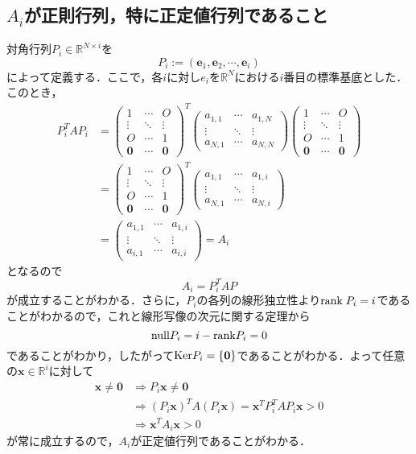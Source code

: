 \documentclass{jsarticle}
\theoremstyle{definition}
\theoremstyle{mystyle} %
\begin{document}
\subsection*{\Large $A_i$が正則行列，特に正定値行列であること}
対角行列$P_i\in \mathbb{R}^{N\times i}$を
$$P_i:=({\bm e_1},{\bm e_2},\cdots ,{\bm e_i})$$
によって定義する．ここで，各$i$に対し$e_i$を$\mathbb{R}^N$における$i$番目の標準基底とした．このとき，
\begin{align*}
P_i^TA P_i&=\left(\begin{array}{ccc}
1 & \cdots & O \\
\vdots & \ddots & \vdots \\
O & \cdots & 1 \\
\hline
{\bm 0} & \cdots & {\bm 0}
\end{array}\right)^T
\begin{pmatrix}
a_{1,1}&\cdots&a_{1,N}\\
\vdots & \ddots & \vdots \\
a_{N,1} & \cdots & a_{N,N} 
\end{pmatrix}\left(\begin{array}{ccc}
1 & \cdots & O \\
\vdots & \ddots & \vdots \\
O & \cdots & 1 \\
\hline
{\bm 0} & \cdots & {\bm 0}
\end{array}\right)\\
&=\left(\begin{array}{ccc}
1 & \cdots & O \\
\vdots & \ddots & \vdots \\
O & \cdots & 1 \\
\hline
{\bm 0} & \cdots & {\bm 0}
\end{array}\right)^T\begin{pmatrix}
a_{1,1}&\cdots & a_{1,i}\\
\vdots & \ddots & \vdots \\
a_{N,1} & \cdots & a_{N,i}
\end{pmatrix}\\
&=\begin{pmatrix}
a_{1,1}&\cdots & a_{1,i}\\
\vdots & \ddots & \vdots \\
a_{i,1} & \cdots & a_{i,i}
\end{pmatrix}=A_i
\end{align*}
となるので
$$A_i = P_i^T AP$$
が成立することがわかる．さらに，$P_i$の各列の線形独立性より${\rm rank}\;P_i = i$であることがわかるので，これと線形写像の次元に関する定理から
$${\rm null}P_i = i-{\rm rank}P_i=0$$
であることがわかり，したがって${\rm Ker}P_i= \{{\bm 0}\}$であることがわかる．よって任意の${\bm x}\in \mathbb{R}^i$に対して
\begin{align*}
{\bm x}\neq {\bm 0}&\Rightarrow P_i{\bm x}\neq {\bm 0}\\
&\Rightarrow (P_i{\bm x})^T A(P_i{\bm x})={\bm x}^TP_i^TAP_i{\bm x}>0\\
&\Rightarrow {\bm x}^TA_i{\bm x}>0
\end{align*}
が常に成立するので，$A_i$が正定値行列であることがわかる．\\
\end{document}
